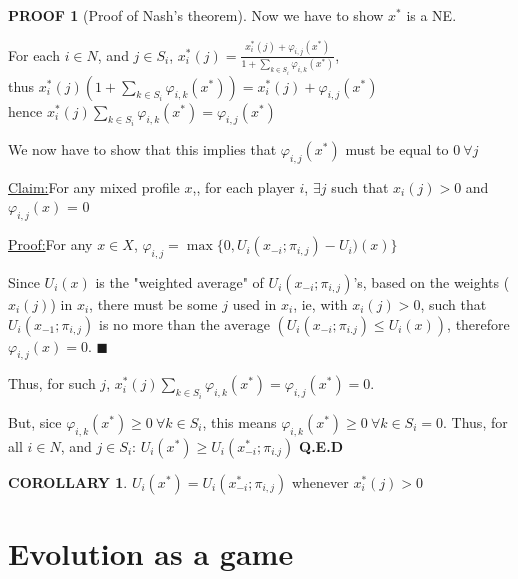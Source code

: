\documentclass[12pt]{article}
\theoremstyle{definition}
\newtheorem*{Proof}{PROOF}
\newtheorem*{corollary}{COROLLARY}
\newenvironment{claim}[1]{\par\noindent\underline{Claim:}\space#1}{}
\newenvironment{claimproof}[1]{\par\noindent\underline{Proof:}\space#1}{\hfill $\blacksquare$}
\begin{document}
\begin{Proof}[Proof of Nash's theorem]
        Now we have to show $x^*$ is a NE.

        For each $i \in N$, and $j \in S_i$, $\displaystyle x_i^*(j) = \frac{x_i^*(j) + \varphi_{i,j}(x^*)}{1 + \sum_{k \in S_i} \varphi_{i,k}(x^*)}$,
        \\thus $x_i^*(j)\left(1 + \sum_{k \in S_i} \varphi_{i,k}(x^*)\right) = x_i^*(j) + \varphi_{i,j}(x^*)$
        \\hence $x_i^*(j)\sum_{k \in S_i} \varphi_{i,k}(x^*) = \varphi_{i,j}(x^*)$

        We now have to show that this implies that $\varphi_{i,j}(x^*)$ must be equal to  $0\ \forall j$

        \begin{claim}
            For any mixed profile $x$,, for each player $i$, $\exists j$ such that $x_i(j) > 0$ and $\varphi_{i,j}(x)$ = 0
        \end{claim}
        \begin{claimproof}
            For any $x \in X$, $\varphi_{i,j} = \max\{0, U_i(x_{-i};\pi_{i,j}) - U_i)(x)\}$

            Since $U_i(x)$ is the "weighted average" of $U_i(x_{-i};\pi_{i,j})$'s, based on the weights ($x_i(j)$) in $x_i$, there must be some $j$ used in $x_i$, ie, with $x_i(j) >  0$, such that $U_i(x_{-1}; \pi_{i,j})$ is no more than the average $\left(U_i(x_{-i};\pi_{i.j}) \leq U_i(x)\right)$, therefore $\varphi_{i,j}(x) = 0$.
        \end{claimproof}

        Thus, for such $j$, $x_i^*(j)\sum_{k \in S_i} \varphi_{i,k}(x^*) = \varphi_{i,j}(x^*) = 0$.

        But, sice $\varphi_{i,k}(x^*) \geq 0 \ \forall k \in S_i$, this means $\varphi_{i,k}(x^*) \geq 0 \ \forall k \in S_i = 0$. Thus, for all $i \in N$, and $j \in S_i$: $U_i(x^*) \geq U_i(x_{-i}^*;\pi_{i.j})$ \hfill\textbf{Q.E.D}
    \end{Proof}

    \begin{corollary}
        $U_i(x^*) = U_i(x_{-i}^*;\pi_{i,j})$ whenever $x_i^*(j) > 0$
    \end{corollary}

\section{Evolution as a game}
\end{document}
